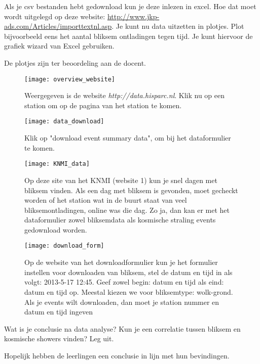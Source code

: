 \begin{questions}
\question 
Als je csv bestanden hebt gedownload kun je deze inlezen in excel. Hoe dat moet 
wordt uitgelegd op deze website: \url{ http://www.jkp-ads.com/Articles/importtextnl.asp}.
Je kunt nu data uitzetten in plotjes.
Plot bijvoorbeeld eens het aantal bliksem ontladingen tegen tijd.
Je kunt hiervoor de grafiek wizard van Excel gebruiken.
\begin{solution}
    De plotjes zijn ter beoordeling aan de docent. 
\end{solution}

\begin{figure}
    \centering
    \texttt{[image: overview\_website]}
    \caption{Weergegeven is de website \textit{http://data.hisparc.nl}. 
    Klik nu op een station om op de pagina van 
    het station te komen.}
    \label{fig:overview_website}
\end{figure}

\begin{figure}
    \centering
    \texttt{[image: data\_download]}
    \caption{Klik op "download event summary data", om bij het dataformulier te komen.}
    \label{fig:data_download}
\end{figure}

\begin{figure}
    \centering
    \texttt{[image: KNMI\_data]}
    \caption{Op deze site van het KNMI (website 1) kun je snel dagen met bliksem vinden. Als een dag 
    met bliksem is gevonden, moet gecheckt worden of het \hisparc station wat in de
    buurt staat van veel bliksemontladingen, online was die dag. Zo ja, dan kan 
    er met het dataformulier zowel bliksemdata als kosmische straling events
    gedownload worden.}
    \label{fig:KNMI_data}
\end{figure}

\begin{figure}
    \centering
    \texttt{[image: download\_form]}
    \caption{Op de website van het downloadformulier kun je het formulier 
    instellen voor downloaden van bliksem, stel de datum en tijd in als volgt:
    2013-5-17 12:45. Geef zowel begin: datum en tijd als eind: datum en tijd op. Meestal 
    kiezen we voor bliksemtype: wolk-grond. Als je events wilt downloaden, dan 
    moet je station nummer en datum en tijd ingeven }
    \label{fig:download_form}
\end{figure}


\question 
Wat is je conclusie na data analyse? Kun je een correlatie tussen bliksem en
kosmische showers vinden? Leg uit.
\begin{solution}
    Hopelijk hebben de leerlingen een conclusie in lijn met hun bevindingen.
\end{solution}

\end{questions}


